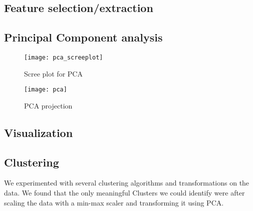 \subsection{Feature selection/extraction}%
\label{sub:feature-selection}

\subsection{Principal Component analysis}%
\label{sub:pca}

\begin{figure}[H]
  \texttt{[image: pca\_screeplot]}
  \caption{Scree plot for PCA}%
  \label{fig:pca-scree}
\end{figure}

\begin{figure}[H]
  \texttt{[image: pca]}
  \caption{PCA projection}%
  \label{fig:pca}
\end{figure}

\subsection{Visualization}%
\label{sub:visualization}

\subsection{Clustering}%
\label{sub:clustering}

We experimented with several clustering algorithms and transformations on the data. We
found that the only meaningful Clusters we could identify were after scaling the data with
a min-max scaler and transforming it using PCA.
